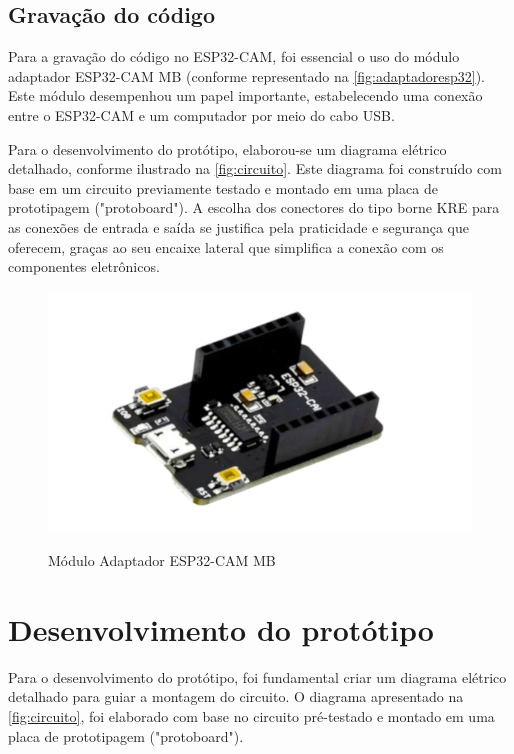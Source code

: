 \subsection{Gravação do código}\label{sec:gravador}

Para a gravação do código no ESP32-CAM, foi essencial o uso do módulo 
adaptador ESP32-CAM MB (conforme representado na 
\autoref{fig:adaptadoresp32}). Este módulo desempenhou um papel importante, 
estabelecendo uma conexão entre o ESP32-CAM e um computador por meio 
do cabo USB.

Para o desenvolvimento do protótipo, elaborou-se um diagrama elétrico 
detalhado, conforme ilustrado na \autoref{fig:circuito}. Este diagrama 
foi construído com base em um circuito previamente testado e montado em 
uma placa de prototipagem ("protoboard"). A escolha dos conectores do 
tipo borne KRE para as conexões de entrada e saída se justifica pela 
praticidade e segurança que oferecem, graças ao seu encaixe lateral que 
simplifica a conexão com os componentes eletrônicos.

\begin{figure}[h!]
    \centering
    \caption{Módulo Adaptador ESP32-CAM MB}
    \includegraphics[scale=0.25]{figuras/adaptador_esp32cam.png}
    \label{fig:adaptadoresp32}
    \centering
\end{figure}

\section{Desenvolvimento do protótipo}\label{sec:prototipo}

Para o desenvolvimento do protótipo, foi fundamental criar um diagrama 
elétrico detalhado para guiar a montagem do circuito. O diagrama 
apresentado na \autoref{fig:circuito}, foi elaborado com base no 
circuito pré-testado e montado em uma placa de prototipagem ("protoboard").

